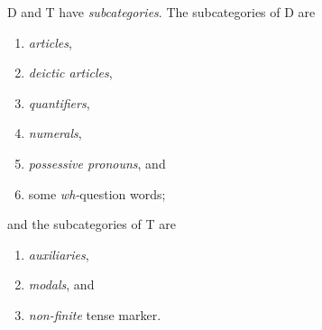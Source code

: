D and T have \emph{subcategories}. The subcategories of D are
\begin{enumerate}
  \item \emph{articles},
  \item \emph{deictic articles},
  \item \emph{quantifiers},
  \item \emph{numerals},
  \item \emph{possessive pronouns}, and
  \item some \textit{wh-}question words;
\end{enumerate}
and the subcategories of T are
\begin{enumerate}
  \item \emph{auxiliaries},
  \item \emph{modals}, and
  \item \emph{non-finite} tense marker.
\end{enumerate}

\Edc
